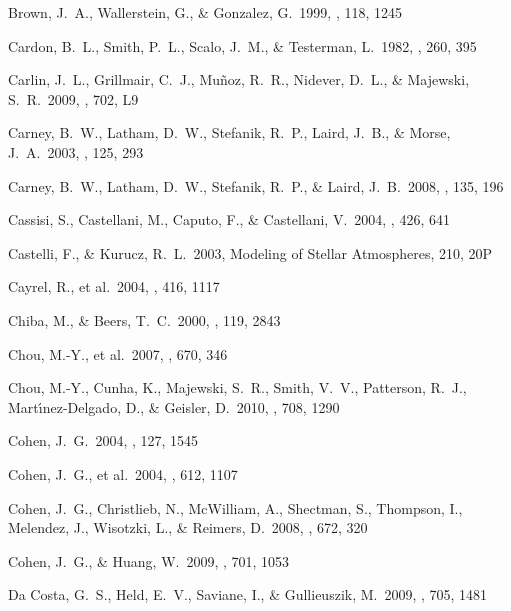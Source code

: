 \documentclass{emulateapj}
\begin{document}
\begin{thebibliography}{}
 Brown, J.~A., 
Wallerstein, G., \& Gonzalez, G.\ 1999, \aj, 118, 1245 

 Cardon, B.~L., Smith, 
P.~L., Scalo, J.~M., \& Testerman, L.\ 1982, \apj, 260, 395 

 Carlin, J.~L., 
Grillmair, C.~J., Mu{\~n}oz, R.~R., Nidever, D.~L., 
\& Majewski, S.~R.\ 2009, \apjl, 702, L9 

 Carney, B.~W., Latham, 
D.~W., Stefanik, R.~P., Laird, J.~B., \& Morse, J.~A.\ 2003, \aj, 125, 293 

 Carney, B.~W., Latham, 
D.~W., Stefanik, R.~P., \& Laird, J.~B.\ 2008, \aj, 135, 196 

 Cassisi, S., Castellani, M., 
Caputo, F., \& Castellani, V.\ 2004, \aap, 426, 641 

 Castelli, F., \& Kurucz, R.~L.\ 
2003, Modeling of Stellar Atmospheres, 210, 20P 

 Cayrel, R., et al.\ 2004, 
\aap, 416, 1117 

 Chiba, M., \& Beers, T.~C.\ 2000, 
\aj, 119, 2843 

 Chou, M.-Y., et al.\ 2007, 
\apj, 670, 346 

 Chou, M.-Y., Cunha, K., 
Majewski, S.~R., Smith, V.~V., Patterson, R.~J., Mart{\'{\i}}nez-Delgado, 
D., \& Geisler, D.\ 2010, \apj, 708, 1290 


 Cohen, J.~G.\ 2004, \aj, 127, 1545 

 Cohen, J.~G., et al.\ 
2004, \apj, 612, 1107 

 Cohen, J.~G., Christlieb, 
N., McWilliam, A., Shectman, S., Thompson, I., Melendez, J., Wisotzki, L., 
\& Reimers, D.\ 2008, \apj, 672, 320 

 Cohen, J.~G., \& Huang, W.\ 
2009, \apj, 701, 1053 

\bibitem[Da Costa et al.(2009)]{dacosta09} Da Costa, G.~S., Held, 
E.~V., Saviane, I., \& Gullieuszik, M.\ 2009, \apj, 705, 1481 


\end{thebibliography}
\end{document}
